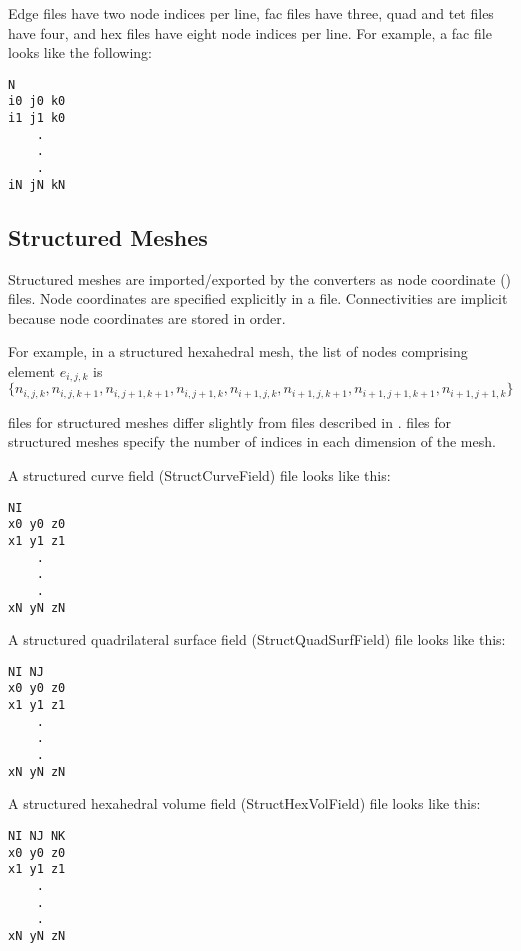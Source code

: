 Edge files have two node indices per line, fac files have three, quad
and tet files have four, and hex files have eight node indices per
line.  For example, a fac file looks like the following:

\begin{verbatim}
N
i0 j0 k0
i1 j1 k0
    .
    .
    .
iN jN kN
\end{verbatim}


\subsection{Structured Meshes}
\label{sec:struct_meshes}

Structured meshes are imported/exported by the converters as node
coordinate () files.  Node coordinates are specified explicitly in a
 file. Connectivities are implicit because node coordinates are
stored in  order.

For example, in a structured hexahedral mesh, the list of nodes comprising
element \(e_{i,j,k}\) is \(\{n_{i,j,k}, n_{i,j,k+1}, n_{i,j+1,k+1}, n_{i,j+1,k}, n_{i+1,j,k}, n_{i+1,j,k+1}, n_{i+1,j+1,k+1}, n_{i+1,j+1,k}\}\)

 files for structured meshes differ slightly
from  files described in .   files for
structured meshes specify the number of indices in each dimension of the
mesh. 

A structured curve field (StructCurveField)  file looks
like this:

\begin{verbatim}
NI
x0 y0 z0
x1 y1 z1
    .
    .
    .
xN yN zN
\end{verbatim}

A structured quadrilateral surface field
(StructQuadSurfField)  file looks like this:

\begin{verbatim}
NI NJ
x0 y0 z0
x1 y1 z1
    .
    .
    .
xN yN zN
\end{verbatim}

A structured hexahedral volume field (StructHexVolField)
 file looks like this:

\begin{verbatim}
NI NJ NK
x0 y0 z0
x1 y1 z1
    .
    .
    .
xN yN zN
\end{verbatim}


